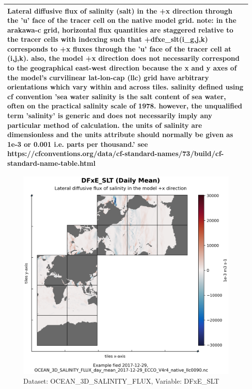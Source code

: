 \begin{longtable}{|m{}|m{}|m{}|m{}|}
\multicolumn{4}{|p{1\textwidth}|}{Lateral diffusive flux of salinity (salt) in the +x direction through the 'u' face of the tracer cell on the native model grid. note: in the arakawa-c grid, horizontal flux quantities are staggered relative to the tracer cells with indexing such that +dfxe\_slt(i\_g,j,k) corresponds to +x fluxes through the 'u' face of the tracer cell at (i,j,k). also, the model +x direction does not necessarily correspond to the geographical east-west direction because the x and y axes of the model's curvilinear lat-lon-cap (llc) grid have arbitrary orientations which vary within and across tiles. salinity defined using cf convention 'sea water salinity is the salt content of sea water, often on the practical salinity scale of 1978. however, the unqualified term 'salinity' is generic and does not necessarily imply any particular method of calculation. the units of salinity are dimensionless and the units attribute should normally be given as 1e-3 or 0.001 i.e. parts per thousand.' see https://cfconventions.org/data/cf-standard-names/73/build/cf-standard-name-table.html} \\ \hline
\end{longtable}

\begin{figure}[H]
\centering
\includegraphics[scale=0.55]{../images/plots/native_plots/Ocean_Three-Dimensional_Salinity_Fluxes/DFxE_SLT.png}
\caption{Dataset: OCEAN\_3D\_SALINITY\_FLUX, Variable: DFxE\_SLT}
\label{tab:table-OCEAN_3D_SALINITY_FLUX_DFxE_SLT-Plot}
\end{figure}
\pagebreak
